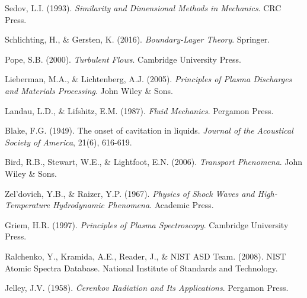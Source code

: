 \documentclass[12pt,a4paper]{article}
\begin{document}
\begin{thebibliography}{99}
Sedov, L.I. (1993). \textit{Similarity and Dimensional Methods in Mechanics}. CRC Press.

Schlichting, H., \& Gersten, K. (2016). \textit{Boundary-Layer Theory}. Springer.

Pope, S.B. (2000). \textit{Turbulent Flows}. Cambridge University Press.

Lieberman, M.A., \& Lichtenberg, A.J. (2005). \textit{Principles of Plasma Discharges and Materials Processing}. John Wiley \& Sons.

Landau, L.D., \& Lifshitz, E.M. (1987). \textit{Fluid Mechanics}. Pergamon Press.

Blake, F.G. (1949). The onset of cavitation in liquids. \textit{Journal of the Acoustical Society of America}, 21(6), 616-619.

Bird, R.B., Stewart, W.E., \& Lightfoot, E.N. (2006). \textit{Transport Phenomena}. John Wiley \& Sons.

Zel'dovich, Y.B., \& Raizer, Y.P. (1967). \textit{Physics of Shock Waves and High-Temperature Hydrodynamic Phenomena}. Academic Press.

Griem, H.R. (1997). \textit{Principles of Plasma Spectroscopy}. Cambridge University Press.

Ralchenko, Y., Kramida, A.E., Reader, J., \& NIST ASD Team. (2008). NIST Atomic Spectra Database. National Institute of Standards and Technology.

Jelley, J.V. (1958). \textit{Čerenkov Radiation and Its Applications}. Pergamon Press.

\end{thebibliography}
\end{document}
